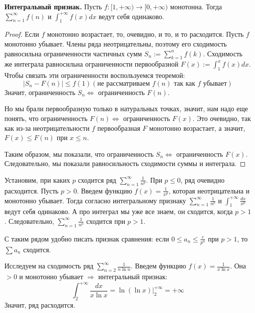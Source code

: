 \textbf{Интегральный признак.}
Пусть $f: [1, +\infty) \to [0, +\infty)$ монотонна. 
Тогда $\sum\limits_{n = 1}^\infty f(n)$ и $\int_1^{+\infty} f(x)dx$ ведут себя одинаково. 
\begin{proof}
    Если $f$ монотонно возрастает, то, очевидно, и то, и то расходится.
    Пусть $f$ монотонно убывает. 
    Члены ряда неотрицательны, поэтому его сходимость равносильна ограниченности частичных сумм $S_n := \sum\limits_{k = 1}^n f(k)$.
    Сходимость же интеграла равносильна ограниченности первообразной $F(x) := \int_1^x f(x)dx$.  
    Чтобы связать эти ограниченности воспользуемся теоремой: \[ \left| S_n - F(n) \right| \leqslant f(1) (\text{не рассматриваем $f(n)$ так как $f$ убывает}) \]
    \quad Значит, ограниченность $S_n \Leftrightarrow$ ограниченность $F(n)$.
    
    \quad Но мы брали первообразную только в натуральных точках, значит, нам надо еще понять, что ограниченность $F(n) \Leftrightarrow$ ограниченность $F(x)$.
    Это очевидно, так как из-за неотрицательности $f$ первообразная $F$ монотонно возрастает, а значит, $F(x) \leqslant F(n)$ при $x \leqslant n$.

    \quad Таким образом, мы показали, что ограниченность $S_n \Leftrightarrow$ ограниченность $F(x)$. 
    Следовательно, мы показали равносильность сходимости суммы и интеграла.
\end{proof}

\vspace{6mm}

\begin{example}
    Установим, при каких $p$ сходится ряд $\sum\limits_{n = 1}^{\infty} \frac{1}{n^p}$.
    При $p \leqslant 0$, ряд очевидно расходится. 
    Пусть $p > 0$.
    Введем функцию $f(x) = \frac{1}{x^p}$, которая неотрицательна и монотонно убывает. 
    Тогда согласно интегральному признаку $\sum\limits_{n = 1}^{\infty} \frac{1}{n^p}$ и $\int_1^{+\infty} \frac{dx}{x^p}$ ведут себя одинаково. 
    А про интеграл мы уже все знаем, он сходится, когда $p > 1$. 
    Следовательно, $\sum\limits_{n = 1}^{\infty} \frac{1}{n^p}$ сходится при $p > 1$.
\end{example}

\begin{follow}
    С таким рядом удобно писать признак сравнения: если $0 \leqslant a_n \leqslant \frac{c}{p^n}$ при $p > 1$, то $\sum a_n$ сходится. 
\end{follow}

\begin{example}
    Исследуем на сходимость ряд $\sum\limits_{n = 2}^\infty \frac{1}{n\ln n}$. 
    Введем функцию $f(x) = \frac{1}{x\ln x}$. Она $> 0$ и монотонно убывает $\Rightarrow$ интегральный признак: \[ \int_2^{+\infty} \frac{dx}{x\ln x} = \ln(\ln x)\big|_2^{+\infty} = +\infty \]
    Значит, ряд расходится. 
\end{example}

